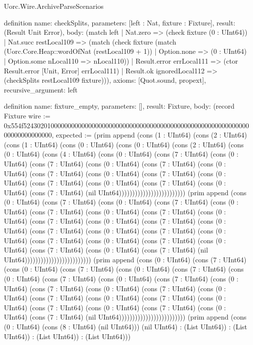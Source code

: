 \begin{lexlean}{Uorc.Wire.ArchiveParseScenarios}
\begin{semanticmodule}
definition{
  name: checkSplits,
  parameters: [left : Nat, fixture : Fixture],
  result: (Result Unit Error),
  body: (match left
    | Nat.zero => (check fixture (0 : UInt64))
    | Nat.succ restLocal109 => (match (check fixture (match (Uorc.Core.Heap::wordOfNat (restLocal109 + 1))
        | Option.none => (0 : UInt64)
        | Option.some nLocal110 => nLocal110))
      | Result.error errLocal111 => (ctor Result.error [Unit, Error] errLocal111)
      | Result.ok ignoredLocal112 => (checkSplits restLocal109 fixture))),
  axioms: [Quot.sound, propext],
  recursive_argument: left
}

definition{
  name: fixture_empty,
  parameters: [],
  result: Fixture,
  body: (record Fixture {wire := 0x554f52430201000000000000000000000000000000000000000000000000000000000000000000000000, expected := (prim append (cons (1 : UInt64) (cons (2 : UInt64) (cons (1 : UInt64) (cons (0 : UInt64) (cons (0 : UInt64) (cons (2 : UInt64) (cons (0 : UInt64) (cons (4 : UInt64) (cons (0 : UInt64) (cons (7 : UInt64) (cons (0 : UInt64) (cons (7 : UInt64) (cons (0 : UInt64) (cons (7 : UInt64) (cons (0 : UInt64) (cons (7 : UInt64) (cons (0 : UInt64) (cons (7 : UInt64) (cons (0 : UInt64) (cons (7 : UInt64) (cons (0 : UInt64) (cons (7 : UInt64) (cons (0 : UInt64) (cons (7 : UInt64) (nil UInt64))))))))))))))))))))))))) (prim append (cons (0 : UInt64) (cons (7 : UInt64) (cons (0 : UInt64) (cons (7 : UInt64) (cons (0 : UInt64) (cons (7 : UInt64) (cons (0 : UInt64) (cons (7 : UInt64) (cons (0 : UInt64) (cons (7 : UInt64) (cons (0 : UInt64) (cons (7 : UInt64) (cons (0 : UInt64) (cons (7 : UInt64) (cons (0 : UInt64) (cons (7 : UInt64) (cons (0 : UInt64) (cons (7 : UInt64) (cons (0 : UInt64) (cons (7 : UInt64) (cons (0 : UInt64) (cons (7 : UInt64) (cons (0 : UInt64) (cons (7 : UInt64) (nil UInt64))))))))))))))))))))))))) (prim append (cons (0 : UInt64) (cons (7 : UInt64) (cons (0 : UInt64) (cons (7 : UInt64) (cons (0 : UInt64) (cons (7 : UInt64) (cons (0 : UInt64) (cons (7 : UInt64) (cons (0 : UInt64) (cons (7 : UInt64) (cons (0 : UInt64) (cons (7 : UInt64) (cons (0 : UInt64) (cons (7 : UInt64) (cons (0 : UInt64) (cons (7 : UInt64) (cons (0 : UInt64) (cons (7 : UInt64) (cons (0 : UInt64) (cons (7 : UInt64) (cons (0 : UInt64) (cons (7 : UInt64) (cons (0 : UInt64) (cons (7 : UInt64) (nil UInt64))))))))))))))))))))))))) (prim append (cons (0 : UInt64) (cons (8 : UInt64) (nil UInt64))) (nil UInt64) : (List UInt64)) : (List UInt64)) : (List UInt64)) : (List UInt64))})
}


\end{semanticmodule}
\end{lexlean}
